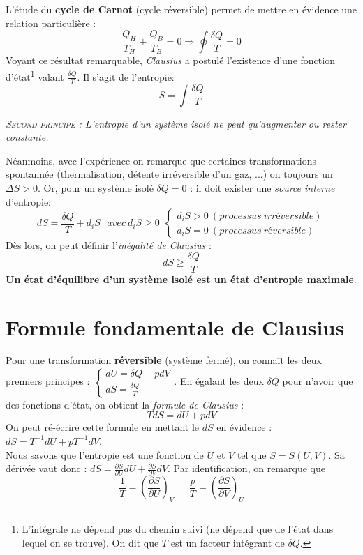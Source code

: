 \documentclass[11pt, a4paper, openany]{book}
\begin{document}
L'étude du \textbf{cycle de Carnot} (cycle réversible) permet de mettre en évidence une relation particulière :
\begin{equation}
\frac{Q_H}{T_H}+\frac{Q_B}{T_B}=0\Rightarrow\oint \frac{\delta Q}{T} = 0
\end{equation}
Voyant ce résultat remarquable, \textit{Clausius} a postulé l'existence d'une fonction d'état\footnote{L'intégrale ne dépend pas du chemin suivi (ne dépend que de l'état dans lequel on se trouve). On dit que $T$ est un facteur intégrant de $\delta Q$.} valant $\frac{\delta Q}{T}$. Il s'agit de l'entropie:
\begin{equation}
S = \int \frac{\delta Q}{T}
\end{equation}
\begin{center}
\textit{\textsc{Second principe :} L'entropie d'un système isolé ne peut qu'augmenter ou rester constante.}
\end{center}
Néanmoins, avec l'expérience on remarque que certaines transformations spontannée (thermalisation, détente irréversible d'un gaz, ...) on toujours un $\Delta S > 0$. Or, pour un système isolé $\delta Q  = 0$ : il doit exister une \textit{source interne} d'entropie:
\begin{equation}
dS = \frac{\delta Q}{T} + d_i S\ \ \ avec\ d_iS \geq 0\ \ \left\{\begin{array}{l}
d_iS > 0\ (processus\ irréversible)\\
d_iS = 0\ (processus\ réversible)
\end{array}\right.
\end{equation}
Dès lors, on peut définir l'\textit{inégalité de Clausius} : 
\begin{equation}
dS \geq \frac{\delta Q}{T}
\end{equation}
\textbf{Un état d'équilibre d'un système isolé est un état d'entropie maximale}.\\


\section{Formule fondamentale de Clausius}
Pour une transformation \textbf{réversible} (système fermé), on connaît les deux premiers principes : $\left\{\begin{array}{l}
dU = \delta Q - pdV\\
dS = \frac{\delta Q}{T}
\end{array}\right.$. En égalant les deux $\delta Q$ pour n'avoir que des fonctions d'état, on obtient la \textit{formule de Clausius} :
\begin{equation}
TdS = dU + pdV
\end{equation}
On peut ré-écrire cette formule en mettant le $dS$ en évidence : $dS = T^{-1}dU + pT^{-1} dV$.\\
Nous savons que l'entropie est une fonction de $U$ et $V$ tel que $S = S(U,V)$. Sa dérivée vaut donc : $dS = \frac{\partial S}{\partial U}dU + \frac{\partial S}{\partial V}dV$. Par identification, on remarque que
\begin{equation}
\frac{1}{T} = \left(\frac{\partial S}{\partial U}\right)_V\ \ \ \ \ \ \ \frac{p}{T} = \left(\frac{\partial S}{\partial V}\right)_U
\end{equation}
\end{document}
